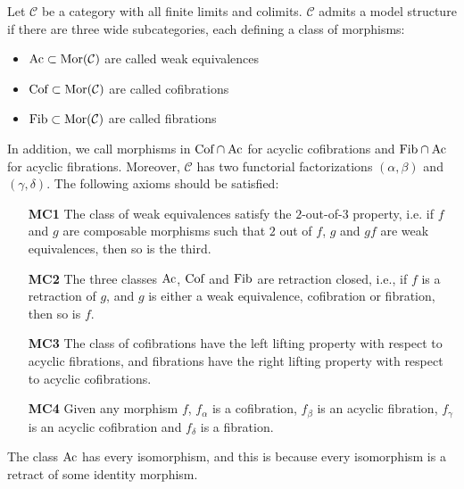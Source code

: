 \documentclass[../thesis.tex]{subfiles}
\begin{document}
            \begin{definition}
                Let $\mathcal{C}$ be a category with all finite limits and colimits. $\mathcal{C}$ admits a model structure if there are three wide subcategories, each defining a class of morphisms:
                \begin{itemize}
                    \item $\tt{Ac} \subset \tt{Mor}(\mathcal{C})$ are called weak equivalences
                    \item $\tt{Cof}\subset \tt{Mor}(\mathcal{C})$ are called cofibrations
                    \item $\tt{Fib}\subset \tt{Mor}(\mathcal{C})$ are called fibrations
                \end{itemize}
                In addition, we call morphisms in $\tt{Cof}\cap \tt{Ac}$ for acyclic cofibrations and $\tt{Fib}\cap \tt{Ac}$ for acyclic fibrations. Moreover, $\mathcal{C}$ has two functorial factorizations $(\alpha, \beta)$ and $(\gamma, \delta)$. The following axioms should be satisfied:
                \begin{itemize}
                    \item[\textbf{MC1}] The class of weak equivalences satisfy the $2$-out-of-$3$ property, i.e. if $f$ and $g$ are composable morphisms such that $2$ out of $f$, $g$ and $gf$ are weak equivalences, then so is the third.
                    \item[\textbf{MC2}] The three classes $\tt{Ac}$, $\tt{Cof}$ and $\tt{Fib}$ are retraction closed, i.e., if $f$ is a retraction of $g$, and $g$ is either a weak equivalence, cofibration or fibration, then so is $f$.
                    \item[\textbf{MC3}] The class of cofibrations have the left lifting property with respect to acyclic fibrations, and fibrations have the right lifting property with respect to acyclic cofibrations.
                    \item[\textbf{MC4}] Given any morphism $f$, $f_\alpha$ is a cofibration, $f_\beta$ is an acyclic fibration, $f_\gamma$ is an acyclic cofibration and $f_\delta$ is a fibration.      
                \end{itemize}
            \end{definition}

            \begin{remark}
                The class $\tt{Ac}$ has every isomorphism, and this is because every isomorphism is a retract of some identity morphism.
            \end{remark}
\end{document}
